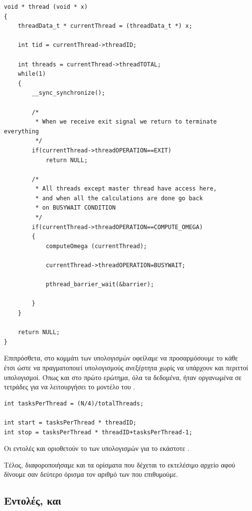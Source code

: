 \documentclass{article}
\begin{document}
\begin{lstlisting}
void * thread (void * x)
{
    threadData_t * currentThread = (threadData_t *) x;

    int tid = currentThread->threadID;

    int threads = currentThread->threadTOTAL;
    while(1)
    {
        __sync_synchronize();

        /*
         * When we receive exit signal we return to terminate everything
         */
        if(currentThread->threadOPERATION==EXIT)
            return NULL;

        /*
         * All threads except master thread have access here, 
         * and when all the calculations are done go back 
         * on BUSYWAIT CONDITION
         */
        if(currentThread->threadOPERATION==COMPUTE_OMEGA)
        {
            computeOmega (currentThread);

            currentThread->threadOPERATION=BUSYWAIT;

            pthread_barrier_wait(&barrier);

        }
    }

    return NULL;
}
\end{lstlisting}

Επιπρόσθετα, στο κομμάτι των υπολογισμών οφείλαμε να προσαρμόσουμε το κάθε  έτσι ώστε να πραγματοποιεί υπολογισμούς ανεξέρτητα χωρίς να υπάρχουν  και περιττοί υπολογισμοί. Όπως και στο πρώτο ερώτημα, όλα τα δεδομένα, ήταν οργανωμένα σε τετράδες για να λειτουργήσει το μοντέλο του . 

\begin{lstlisting}
int tasksPerThread = (N/4)/totalThreads;

int start = tasksPerThread * threadID;
int stop = tasksPerThread * threadID+tasksPerThread-1;
\end{lstlisting}

\begin{warn}[Επισήμανση:\\] %
  Οι εντολές  και  οριοθετούν το  των υπολογισμών για το εκάστοτε .
\end{warn}
Τέλος, διαφοροποιήσαμε και τα ορίσματα που δέχεται το εκτελέσιμο αρχείο αφού δίνουμε σαν δεύτερο όρισμα τον αριθμό των  που επιθυμούμε.

\subsection{ Εντολές,  και  }
\end{document}
